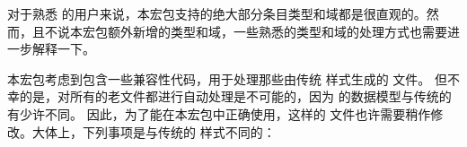 
对于熟悉 \BibTeX 的用户来说，本宏包支持的绝大部分条目类型和域都是很直观的。然而，且不说本宏包额外新增的类型和域，一些熟悉的类型和域的处理方式也需要进一步解释一下。


本宏包考虑到包含一些兼容性代码，用于处理那些由传统 \BibTeX 样式生成的  文件。
但不幸的是，对所有的老文件都进行自动处理是不可能的，因为 \biblatex 的数据模型与传统的 \BibTeX 有少许不同。
因此，为了能在本宏包中正确使用，这样的  文件也许需要稍作修改。大体上，下列事项是与传统的 \BibTeX 样式不同的：

